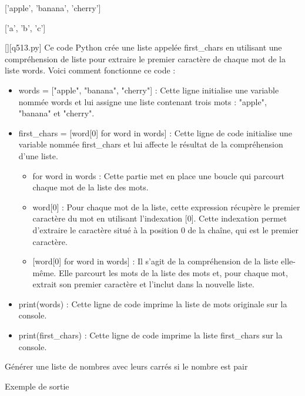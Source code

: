 ['apple', 'banana', 'cherry']

['a', 'b', 'c']
        \par
        \begin{solution}
            \renewcommand{\nomfichier}{q513.py}
            \pythonfile{\chemincode \nomfichier}[][\nomfichier]
            Ce code Python crée une liste appelée first\_chars en utilisant une compréhension de liste pour extraire le premier caractère de chaque mot de la liste words. Voici comment fonctionne ce code :

   \begin{itemize}
   	\item  words = ["apple", "banana", "cherry"] : Cette ligne initialise une variable nommée words et lui assigne une liste contenant trois mots : "apple", "banana" et "cherry".
   	\item     first\_chars = [word[0] for word in words] : Cette ligne de code initialise une variable nommée first\_chars et lui affecte le résultat de la compréhension d'une liste.
   
       \begin{itemize}
       	\item  for word in words : Cette partie met en place une boucle qui parcourt chaque mot de la liste des mots.
       	\item         word[0] : Pour chaque mot de la liste, cette expression récupère le premier caractère du mot en utilisant l'indexation [0]. Cette indexation permet d'extraire le caractère situé à la position 0 de la chaîne, qui est le premier caractère.
       	\item{}         [word[0] for word in words] : Il s'agit de la compréhension de la liste elle-même. Elle parcourt les mots de la liste des mots et, pour chaque mot, extrait son premier caractère et l'inclut dans la nouvelle liste.
       \end{itemize}
    \item print(words) : Cette ligne de code imprime la liste de mots originale sur la console.
    \item print(first\_chars) : Cette ligne de code imprime la liste first\_chars sur la console.
    \end{itemize}
        \end{solution}
        

        \question
        Générer une liste de nombres avec leurs carrés si le nombre est pair

Exemple de sortie

